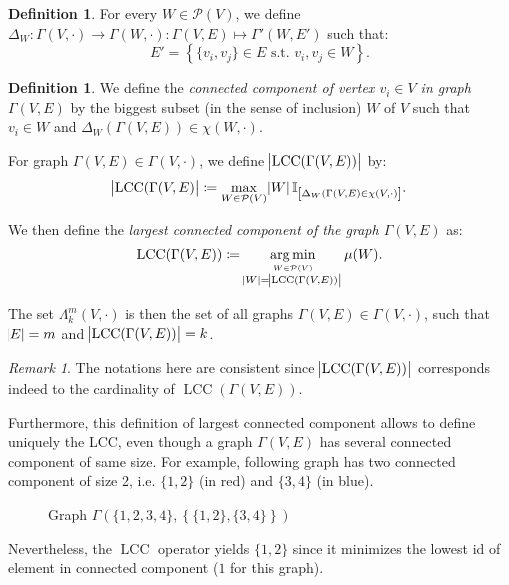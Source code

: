 \documentclass{article}
\theoremstyle{definition}
\newtheorem{definition}[lemma]{Definition}
\theoremstyle{remark}
\newtheorem*{remark}{Remark}
\DeclareMathOperator{\LCC}{LCC}
\DeclareMathOperator*{\argmin}{arg\,min}
\newcommand{\st}{\text{ s.t. }}
\begin{document}
		\begin{definition} For every $W \in \mathcal P(V)$, we define $\Delta_W : \Gamma(V, \cdot) \to \Gamma(W, \cdot) : \Gamma(V, E) \mapsto \Gamma'(W, E')$
		such that:
		\[E' = \left\{\{v_i, v_j\} \in E \st v_i, v_j \in W\right\}.\]
		\end{definition}

		\begin{definition} We define the \textit{connected component of vertex $v_i \in V$ in graph $\Gamma(V, E)$} by the biggest subset (in the sense of inclusion) $W$
		of $V$ such that $v_i \in W$ and $\Delta_W(\Gamma(V, E)) \in \chi(W, \cdot)$.

		For graph $\Gamma(V, E) \in \Gamma(V, \cdot)$, we define $\abs {\LCC(\Gamma(V, E))}$ by:
		\[\abs {\LCC(\Gamma(V, E)} \coloneqq \max_{W \in \mathcal P(V)}\abs W\mathbb I_{\left[\Delta_W(\Gamma(V, E) \in \chi(V, \cdot)\right]}.\]

		We then define the \textit{largest connected component of the graph $\Gamma(V, E)$} as:
		\[\LCC(\Gamma(V, E)) \coloneqq \argmin_{\stackrel {W \in \mathcal P(V)}{\abs W = \abs {\LCC(\Gamma(V, E))}}} \mu(W).\]

		The set $\Lambda_k^m(V, \cdot)$ is then the set of all graphs $\Gamma(V, E) \in \Gamma(V, \cdot)$, such that $\abs E = m$ and $\abs {\LCC(\Gamma(V, E))} = k$.
		\end{definition}

		\begin{remark} The notations here are consistent since $\abs {\LCC(\Gamma(V, E))}$ corresponds indeed to the cardinality of $\LCC(\Gamma(V, E))$.

		Furthermore, this definition of largest connected component allows to define uniquely the LCC, even though a graph $\Gamma(V, E)$ has several connected component
		of same size. For example, following graph has two connected component of size 2, i.e. $\{1, 2\}$ (in red) and $\{3, 4\}$ (in blue).

		\begin{figure}[H]
		\begin{center}
		\end{center}
		\caption{Graph $\Gamma\left(\{1, 2, 3, 4\}, \left\{\{1, 2\}, \{3, 4\}\right\}\right)$}
		\end{figure}

		Nevertheless, the $\LCC$ operator yields $\{1, 2\}$ since it minimizes the lowest id of element in connected component ($1$ for this graph).
		\end{remark}
\end{document}
